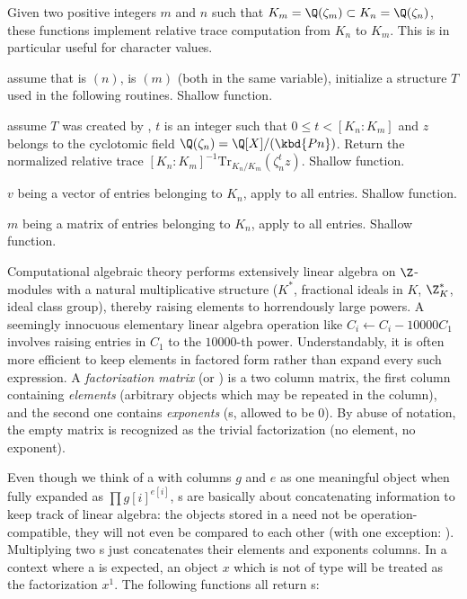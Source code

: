 
Given two positive integers $m$ and $n$ such that $K_m = \Q(\zeta_m) \subset
K_n = \Q(\zeta_n)$, these functions implement relative trace computation from
$K_n$ to $K_m$. This is in particular useful for character values.

 assume
that  is $(n)$,  is $(m)$
(both in the same variable), initialize a structure $T$ used in the following
routines. Shallow function.

 assume $T$ was created
by , $t$ is an integer such that $0 \leq t < [K_n:K_m]$
and $z$ belongs to the cyclotomic field
$\Q(\zeta_n) = \Q[X]/(\kbd{Pn})$. Return the normalized relative trace
$[K_n:K_m]^{-1}\text{Tr}_{K_n/K_m} (\zeta_n^t z)$. Shallow function.

 $v$ being a vector of
entries belonging to $K_n$, apply  to all entries.
Shallow function.

 $m$ being a matrix
of entries belonging to $K_n$, apply  to all entries.
Shallow function.


Computational algebraic theory performs extensively linear
algebra on $\Z$-modules with a natural multiplicative structure ($K^*$,
fractional ideals in $K$, $\Z_K^*$, ideal class group), thereby raising
elements to horrendously large powers. A seemingly innocuous elementary linear
algebra operation like $C_i\leftarrow C_i - 10000 C_1$ involves raising
entries in $C_1$ to the $10000$-th power. Understandably, it is often more
efficient to keep elements in factored form rather than expand every such
expression. A \emph{factorization matrix} (or ) is a two column
matrix, the first column containing \emph{elements} (arbitrary objects which
may be repeated in the column), and the second one contains \emph{exponents}
(s, allowed to be 0). By abuse of notation, the empty matrix
 is recognized as the trivial factorization (no
element, no exponent).

Even though we think of a  with columns $g$ and $e$
as one meaningful object when fully expanded as $\prod g[i]^{e[i]}$,
s are basically about concatenating information to keep track of
linear algebra: the objects stored in a  need not be
operation-compatible, they will not even be compared to each other (with one
exception: ). Multiplying two s just
concatenates their elements and exponents columns. In a context where a
 is expected, an object $x$ which is not of type  will be
treated as the factorization $x^1$. The following functions all return
s:

